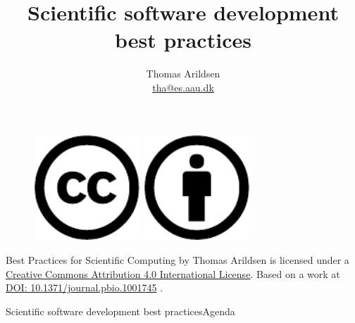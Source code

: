 \documentclass[english]{beamer}
\author[Arildsen] {
  Thomas Arildsen\\
  {\ttfamily \href{mailto:tha@es.aau.dk}{tha@es.aau.dk}} }
\institute[Dept.\ of Electronic Systems, Aalborg University]
{ Dept.\ of Electronic Systems\\
  Aalborg University}
\title{Scientific software development best practices}
\begin{document}

\begin{frame}[plain]
  \titlepage
\end{frame}


\begin{frame}[plain]
  \begin{figure}
    \centering
    \includegraphics[width=4cm]{cc}
    \hspace{1cm}
    \includegraphics[width=4cm]{by}
  \end{figure}
  Best Practices for Scientific Computing by Thomas Arildsen is
  licensed under a
  \href{http://creativecommons.org/licenses/by/4.0/}{Creative Commons
    Attribution 4.0 International License}.  Based on a work at
  \href{http://dx.doi.org/10.1371/journal.pbio.1001745}{DOI:
    10.1371/journal.pbio.1001745} \cite{Wilson2013}.
\end{frame}


\begin{frame}{Scientific software development best practices}{Agenda}
  \tableofcontents
\end{frame}

\end{document}
